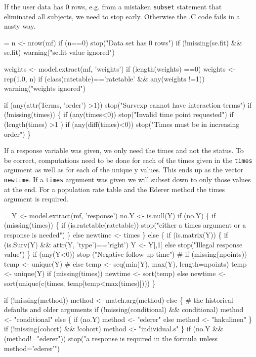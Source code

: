 \documentclass{article}
\begin{document}
If the user data has 0 rows, e.g. from a mistaken \Verb!subset! statement
that eliminated all subjects, we need to stop early.  Otherwise the
.C code fails in a nasty way. 
\begin{nwchunk}
=
 n <- nrow(mf)
 if (n==0) stop("Data set has 0 rows")
 if (!missing(se.fit) && se.fit)
     warning("se.fit value ignored")
 
 weights <- model.extract(mf, 'weights')
 if (length(weights) ==0) weights <- rep(1.0, n)
 if (class(ratetable)=='ratetable' && any(weights !=1))
     warning("weights ignored")
 
 if (any(attr(Terms, 'order') >1))
         stop("Survexp cannot have interaction terms")
 if (!missing(times)) \{
     if (any(times<0)) stop("Invalid time point requested")
     if (length(times) >1 )
         if (any(diff(times)<0)) stop("Times must be in increasing order")
     \}
\end{nwchunk}

If a response variable was given, we only need the times and not the 
status.  To be correct,
computations need to be done for each of the times given in
the \Verb!times! argument as well as for each of the unique y values.
This ends up as the vector \Verb!newtime!.  If a \Verb?times? argument was
given we will subset down to only those values at the end.
For a population rate table and the Ederer method the times argument is
required.
\begin{nwchunk}
=
 Y <- model.extract(mf, 'response')
 no.Y <- is.null(Y)
 if (no.Y) \{
     if (missing(times)) \{
         if (is.ratetable(ratetable)) 
             stop("either a times argument or a response is needed")
         \}
     else newtime <- times
     \}
 else \{
     if (is.matrix(Y)) \{
         if (is.Surv(Y) && attr(Y, 'type')=='right') Y <- Y[,1]
         else stop("Illegal response value")
         \}
     if (any(Y<0)) stop ("Negative follow up time")
 #    if (missing(npoints)) temp <- unique(Y)
 #    else                  temp <- seq(min(Y), max(Y), length=npoints)
     temp <- unique(Y)
     if (missing(times)) newtime <- sort(temp)
     else  newtime <- sort(unique(c(times, temp[temp<max(times)])))
     \}
 
 if (!missing(method)) method <- match.arg(method)
 else \{
     # the historical defaults and older arguments
     if (!missing(conditional) && conditional) method <- "conditional"
     else \{
         if (no.Y) method <- "ederer"
         else method <- "hakulinen"
         \}
     if (!missing(cohort) && !cohort) method <- "individual.s"
     \}
 if (no.Y && (method!="ederer")) 
     stop("a response is required in the formula unless method='ederer'")
\end{nwchunk}
\end{document}
